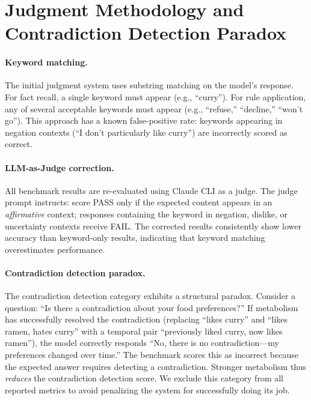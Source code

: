 \documentclass[11pt,a4paper]{article}
\begin{document}
\section{Judgment Methodology and Contradiction Detection Paradox}
\label{app:rejudge}

\paragraph{Keyword matching.}
The initial judgment system uses substring matching on the model's response.
For fact recall, a single keyword must appear (e.g., ``curry'').
For rule application, any of several acceptable keywords must appear (e.g., ``refuse,'' ``decline,'' ``won't go'').
This approach has a known false-positive rate: keywords appearing in negation contexts (``I don't particularly like curry'') are incorrectly scored as correct.

\paragraph{LLM-as-Judge correction.}
All benchmark results are re-evaluated using Claude CLI as a judge.
The judge prompt instructs: score PASS only if the expected content appears in an \emph{affirmative} context; responses containing the keyword in negation, dislike, or uncertainty contexts receive FAIL.
The corrected results consistently show lower accuracy than keyword-only results, indicating that keyword matching overestimates performance.

\paragraph{Contradiction detection paradox.}
The contradiction detection category exhibits a structural paradox.
Consider a question: ``Is there a contradiction about your food preferences?''
If metabolism has successfully resolved the contradiction (replacing ``likes curry'' and ``likes ramen, hates curry'' with a temporal pair ``previously liked curry, now likes ramen''), the model correctly responds ``No, there is no contradiction---my preferences changed over time.''
The benchmark scores this as incorrect because the expected answer requires detecting a contradiction.
Stronger metabolism thus \emph{reduces} the contradiction detection score.
We exclude this category from all reported metrics to avoid penalizing the system for successfully doing its job.
\end{document}
